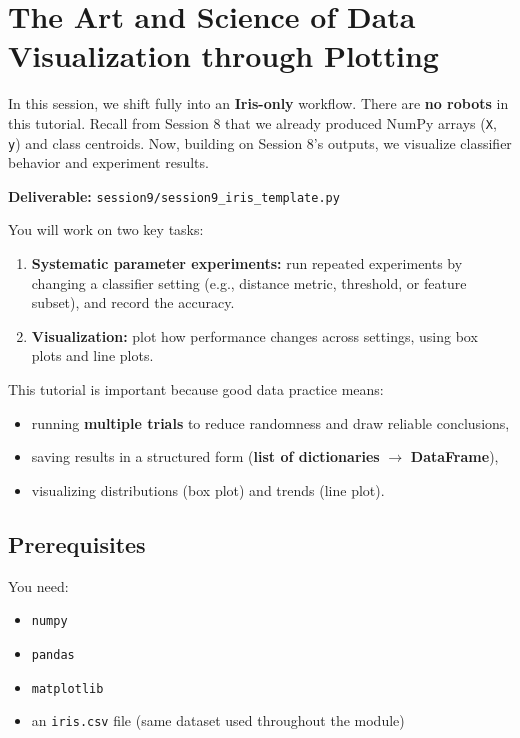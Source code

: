 

\section{The Art and Science of Data Visualization through Plotting }

In this session, we shift fully into an \textbf{Iris-only} workflow. There are \textbf{no robots} in this tutorial.
Recall from Session 8 that we already produced NumPy arrays (\texttt{X}, \texttt{y}) and class centroids.
Now, building on Session 8's outputs, we visualize classifier behavior and experiment results.

\noindent
\textbf{Deliverable:} \texttt{session9/session9\_iris\_template.py}

\noindent
You will work on two key tasks:
\begin{enumerate}\setlength{\itemsep}{2pt}
\item \textbf{Systematic parameter experiments:} run repeated experiments by changing a classifier setting (e.g., distance metric, threshold, or feature subset), and record the accuracy.
\item \textbf{Visualization:} plot how performance changes across settings, using box plots and line plots.
\end{enumerate}

\noindent
This tutorial is important because good data practice means:
\begin{itemize}\setlength{\itemsep}{0pt}
\item running \textbf{multiple trials} to reduce randomness and draw reliable conclusions,
\item saving results in a structured form (\textbf{list of dictionaries} $\rightarrow$ \textbf{DataFrame}),
\item visualizing distributions (box plot) and trends (line plot).
\end{itemize}

\subsection{Prerequisites}
You need:
\begin{itemize}\setlength{\itemsep}{0pt}
\item \texttt{numpy}
\item \texttt{pandas}
\item \texttt{matplotlib}
\item an \texttt{iris.csv} file (same dataset used throughout the module)
\end{itemize}

